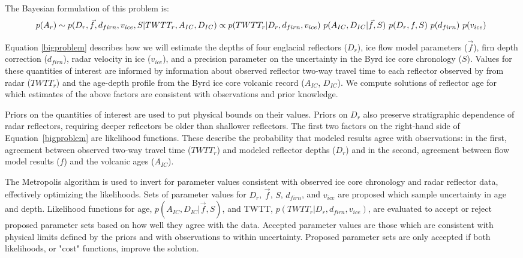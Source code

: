 The Bayesian formulation of this problem is:
\begin{equation}\label{bigproblem}
p(A_r)  \sim \\ p(D_r, \vec{f},d_{firn},v_{ice},S | TWTT_r, A_{IC}, D_{IC})  \propto
p(TWTT_r | D_r,d_{firn},v_{ice} )~p(A_{IC}, D_{IC} | \vec{f},S)~p(D_r, f, S)~p(d_{firn})~p(v_{ice})\
\end{equation}

Equation \ref{bigproblem} describes how we will estimate the depths of four englacial reflectors ($D_r$), ice flow model parameters ($\vec{f}$), firn depth correction ($d_{firn}$), radar velocity in ice ($v_{ice}$), and a precision parameter on the uncertainty in the Byrd ice core chronology ($S$). Values for these quantities of interest are informed by information about observed reflector two-way travel time to each reflector observed by from radar ($TWTT_r$) and the age-depth profile from the Byrd ice core volcanic record ($A_{IC}$, $D_{IC}$). We compute solutions of reflector age for which estimates of the above factors are consistent with observations and prior knowledge.

Priors on the quantities of interest are used to put physical bounds on their values. Priors on ${D_r}$ also preserve stratigraphic dependence of radar reflectors, requiring deeper reflectors be older than shallower reflectors. The first two factors on the right-hand side of Equation~\ref{bigproblem} are likelihood functions. These describe the probability that modeled results agree with observations: in the first, agreement between observed two-way travel time ($TWTT_r$) and modeled reflector depths ($D_r$) and in the second, agreement between flow model results ($f$) and the volcanic ages ($A_{IC}$). 

The Metropolis algorithm is used to invert for parameter values consistent with observed ice core chronology and radar reflector data, effectively optimizing the likelihoods. Sets of parameter values for $D_r$, $\vec{f}$, $S$, $d_{firn}$, and $v_{ice}$ are proposed which sample uncertainty in age and depth. %
Likelihood functions for age, $p(A_{IC},D_{IC} | \vec{f},S)$, and TWTT, $p(TWTT_r | D_r,d_{firn},v_{ice})$, are evaluated to accept or reject proposed parameter sets based on how well they agree with the data. Accepted parameter values are those which are consistent with physical limits defined by the priors and with observations to within uncertainty. Proposed parameter sets are only accepted if both likelihoods, or "cost" functions, improve the solution.

